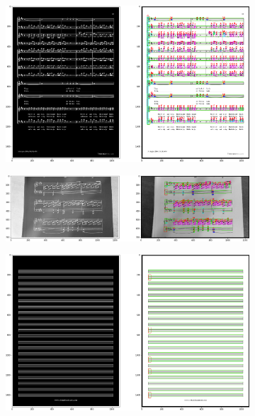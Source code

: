 \documentclass[12pt]{article}
\begin{document}
\begin{enumerate}
\begin{figure}[h!]
				\begin{subfigure}[b]{0.48\linewidth}
					\includegraphics[width=\linewidth]{Eazy/Zdj6.png}
				\end{subfigure}
				\begin{subfigure}[b]{0.48\linewidth}
					\includegraphics[width=\linewidth]{Eazy/Zdj7.png}
				\end{subfigure}
				\begin{subfigure}[b]{0.48\linewidth}
					\includegraphics[width=\linewidth]{Eazy/Zdj8.png}
				\end{subfigure}
				\begin{subfigure}[b]{0.48\linewidth}

\end{subfigure}
\end{figure}
\end{enumerate}
\end{document}

